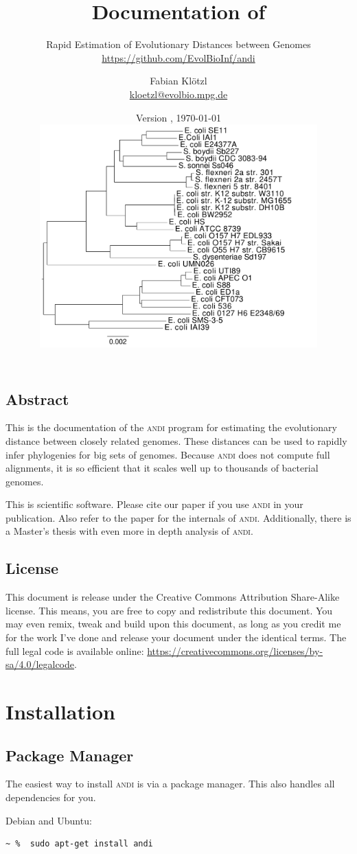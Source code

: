 \documentclass[a4paper,
  10pt,
  english,
  DIV=12,
  BCOR=8mm]{scrbook}
\title{Documentation of \algo{andi}}
\subtitle{Rapid Estimation of Evolutionary Distances between Genomes\\ {\small\url{https://github.com/EvolBioInf/andi}}}
\author{Fabian Klötzl\\ \href{mailto:kloetzl@evolbio.mpg.de}{kloetzl@evolbio.mpg.de}}
\date{Version \version, \isodate\today \\
\vspace*{2cm}
\centering\includegraphics[width=0.8\textwidth]{andi_labels.pdf}}
\newcommand{\algo}[1]{\textsc{{#1}}}
\newcommand{\andi}{\algo{andi}\xspace}
\begin{document}
\maketitle

\section*{Abstract}
This is the documentation of the \andi program for estimating the evolutionary distance between closely related genomes. These distances can be used to rapidly infer phylogenies for big sets of genomes. Because \andi does not compute full alignments, it is so efficient that it scales well up to thousands of bacterial genomes.

This is scientific software. Please cite our paper \cite{andi} if you use \andi in your publication. Also refer to the paper for the internals of \andi. Additionally, there is a Master's thesis with even more in depth analysis of \andi \cite{kloetzl}.

\vspace*{1cm}
\section*{License}
This document is release under the Creative Commons Attribution Share-Alike license. This means, you are free to copy and redistribute this document. You may even remix, tweak and build upon this document, as long as you credit me for the work I've done and release your document under the identical terms. The full legal code is available online: {\small\url{https://creativecommons.org/licenses/by-sa/4.0/legalcode}}.

\tableofcontents

\chapter{Installation} %

\section{Package Manager}

The easiest way to install \andi is via a package manager. This also handles all dependencies for you.


\noindent Debian and Ubuntu:

\begin{lstlisting}
~ %  sudo apt-get install andi
\end{lstlisting}
\end{document}
